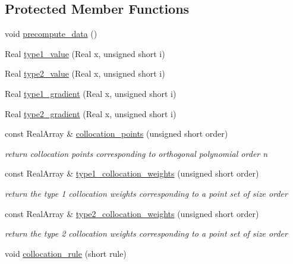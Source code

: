 \subsection*{Protected Member Functions}
\begin{DoxyCompactItemize}
\item 
void \hyperlink{classPecos_1_1HermiteInterpPolynomial_a9a5fd3dc945d15c8423dc66dcd137b4f}{precompute\+\_\+data} ()
\item 
Real \hyperlink{classPecos_1_1HermiteInterpPolynomial_abb79c6ea3bd58a7ca9c4b3bfdd85be9c}{type1\+\_\+value} (Real x, unsigned short i)
\item 
Real \hyperlink{classPecos_1_1HermiteInterpPolynomial_a49797f1037329fbe0a40f13dc23149e1}{type2\+\_\+value} (Real x, unsigned short i)
\item 
Real \hyperlink{classPecos_1_1HermiteInterpPolynomial_a005465761c081a210eef9879ec5686f8}{type1\+\_\+gradient} (Real x, unsigned short i)
\item 
Real \hyperlink{classPecos_1_1HermiteInterpPolynomial_a069b51a84ab3c4a6e635e07b3c8dcfe7}{type2\+\_\+gradient} (Real x, unsigned short i)
\item 
const Real\+Array \& \hyperlink{classPecos_1_1HermiteInterpPolynomial_a10873b28f1284aff4ea214e00c4f86dd}{collocation\+\_\+points} (unsigned short order)
\begin{DoxyCompactList}\small\item\em return collocation points corresponding to orthogonal polynomial order n \end{DoxyCompactList}\item 
const Real\+Array \& \hyperlink{classPecos_1_1HermiteInterpPolynomial_aa010321cf47465dca5725fa15ba58bf6}{type1\+\_\+collocation\+\_\+weights} (unsigned short order)
\begin{DoxyCompactList}\small\item\em return the type 1 collocation weights corresponding to a point set of size order \end{DoxyCompactList}\item 
const Real\+Array \& \hyperlink{classPecos_1_1HermiteInterpPolynomial_a8bc6cc516ab2bccbbdca6e904dc5a10f}{type2\+\_\+collocation\+\_\+weights} (unsigned short order)
\begin{DoxyCompactList}\small\item\em return the type 2 collocation weights corresponding to a point set of size order \end{DoxyCompactList}\item 
void \hyperlink{classPecos_1_1HermiteInterpPolynomial_addd13d4093ce8cbf2d22c47a47aff610}{collocation\+\_\+rule} (short rule)\label{classPecos_1_1HermiteInterpPolynomial_addd13d4093ce8cbf2d22c47a47aff610}


\end{DoxyCompactItemize}
